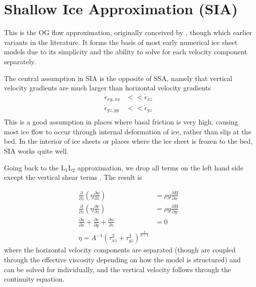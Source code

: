 \documentclass[12pt]{article}
\theoremstyle{definition}
\newcommand{\pd}[2]{\frac{\partial {#1}}{\partial {#2}}}
\begin{document}
\section{Shallow Ice Approximation (SIA)}

This is the OG flow approximation, originally conceived by \cite{hutter1983:theoreticalglac}, though which earlier variants in the literature. It forms the basis of most early numerical ice sheet models due to its simplicity and the ability to solve for each velocity component separately. 

The central assumption in SIA is the opposite of SSA, namely that vertical velocity gradients are much larger than horizontal velocity gradients
\begin{align}
\dot{\epsilon}_{xy,xx} &<< \dot{\epsilon}_{xz} \\
\dot{\epsilon}_{yz,yy} &<< \dot{\epsilon}_{yz} \\
\end{align}
This is a good assumption in places where basal friction is very high, causing most ice flow to occur through internal deformation of ice, rather than slip at the bed. In the interior of ice sheets or places where the ice sheet is frozen to the bed, SIA works quite well.

Going back to the L$_1$L$_2$ approximation, we drop all terms on the left hand side except the vertical shear terms . The result is
\begin{shaded}
\begin{align}
\pd{}{z} \left( \eta \pd{u}{z} \right) &= \rho g \pd{H}{x} \\
\pd{}{z} \left( \eta \pd{v}{z} \right) &= \rho g \pd{H}{y} \\
\pd{u}{x} + \pd{v}{y} + \pd{w}{z} &= 0 \\
\eta = A^{-1} \left(\tau_{xz}^2 + \tau_{yz}^2 \right)^{\frac{2}{n-1}} &
\end{align}
where the horizontal velocity components are separated (though are coupled through the effective viscosity depending on how the model is structured) and can be solved for individually, and the vertical velocity follows through the continuity equation.
\end{shaded}



\end{document}
